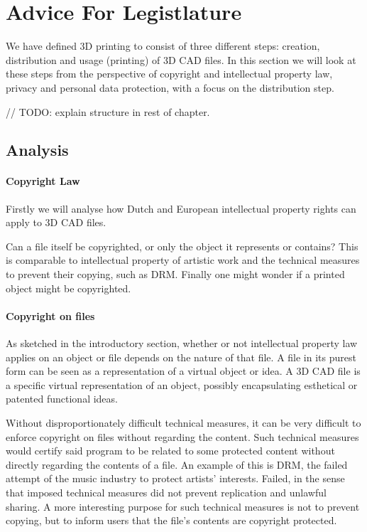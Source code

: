 \section{Advice For Legistlature}

We have defined 3D printing to consist of three different steps: creation, distribution and usage (printing) of 3D CAD files. In this section we will look at these steps from the perspective of copyright and intellectual property law, privacy and personal data protection, with a focus on the distribution step.

// TODO: explain structure in rest of chapter.

\subsection{Analysis}

\paragraph{Copyright Law}
Firstly we will analyse how Dutch and European intellectual property rights can apply to 3D CAD files. 

Can a file itself be copyrighted, or only the object it represents or contains? This is comparable to intellectual property of artistic work and the technical measures to prevent their copying, such as DRM.
Finally one might wonder if a printed object might be copyrighted.

\paragraph{Copyright on files}
As sketched in the introductory section, whether or not intellectual property law applies on an object or file depends on the nature of that file. A file in its purest form can be seen as a representation of a virtual object or idea. A 3D CAD file is a specific virtual representation of an object, possibly encapsulating esthetical or patented functional ideas.

Without disproportionately difficult technical measures, it can be very difficult to enforce copyright on files without regarding the content. Such technical measures would certify said program to be related to some protected content without directly regarding the contents of a file. An example of this is DRM, the failed attempt of the music industry to protect artists’ interests. Failed, in the sense that imposed technical measures did not prevent replication and unlawful sharing. A more interesting purpose for such technical measures is not to prevent copying, but to inform users that the file’s contents are copyright protected.

